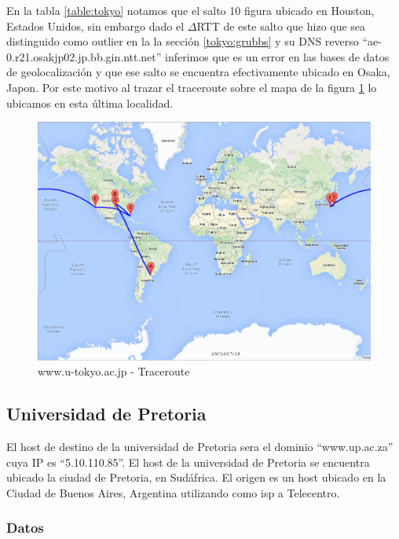 En la tabla \ref{table:tokyo} notamos que el salto 10 figura ubicado en Houston, Estados Unidos, sin embargo dado el $\Delta$RTT de este salto que hizo que sea distinguido como outlier en la la sección \ref{tokyo:grubbs} y su DNS reverso ``ae-0.r21.osakjp02.jp.bb.gin.ntt.net'' inferimos que es un error en las bases de datos de geolocalización y que ese salto se encuentra efectivamente ubicado en Osaka, Japon. Por este motivo al trazar el traceroute sobre el mapa de la figura \ref{mapa:tokyo} lo ubicamos en esta última localidad.

\begin{figure}[H]
    \begin{center}
        \includegraphics[width=1\textwidth]{data/mapa-tokyo.png}
        \caption{www.u-tokyo.ac.jp - Traceroute}
        \label{mapa:tokyo}
    \end{center}
\end{figure}

\subsection{Universidad de Pretoria}
El host de destino de la universidad de Pretoria sera el dominio ``www.up.ac.za'' cuya IP es ``5.10.110.85''. El host de la universidad de Pretoria se encuentra ubicado la ciudad de Pretoria, en Sudáfrica. El origen es un host ubicado en la Ciudad de Buenos Aires, Argentina utilizando como isp a Telecentro.

\subsubsection{Datos}

